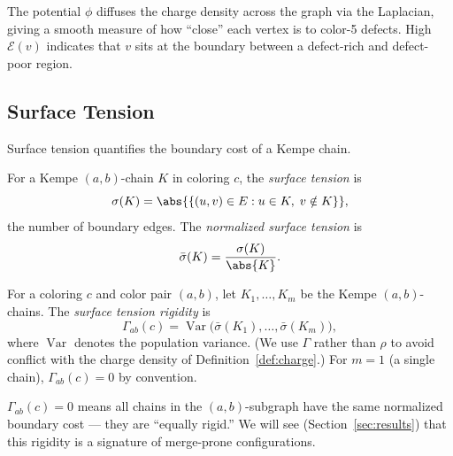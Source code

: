 The potential $\phi$ diffuses the charge density across the graph via
the Laplacian, giving a smooth measure of how ``close'' each vertex is
to color-5 defects. High $\mathcal{E}(v)$ indicates that $v$ sits at
the boundary between a defect-rich and defect-poor region.

\subsection{Surface Tension}\label{sec:surface-tension}

Surface tension quantifies the boundary cost of a Kempe chain.

\begin{definition}\label{def:surface-tension}
For a Kempe $(a,b)$-chain $K$ in coloring $c$, the \emph{surface
tension} is
\begin{equation}\label{eq:surface-tension}
  \sigma(K) = \abs{\{(u, v) \in E : u \in K,\; v \notin K\}},
\end{equation}
the number of boundary edges. The \emph{normalized surface tension} is
\begin{equation}\label{eq:normalized-st}
  \bar{\sigma}(K) = \frac{\sigma(K)}{\abs{K}}.
\end{equation}
\end{definition}

\begin{definition}\label{def:st-rigidity}
For a coloring $c$ and color pair $(a,b)$, let
$K_1, \ldots, K_m$ be the Kempe $(a,b)$-chains. The \emph{surface
tension rigidity} is
\begin{equation}\label{eq:st-rigidity}
  \Gamma_{ab}(c) =
  \operatorname{Var}\bigl(\bar{\sigma}(K_1), \ldots,
  \bar{\sigma}(K_m)\bigr),
\end{equation}
where $\operatorname{Var}$ denotes the population variance. (We use
$\Gamma$ rather than $\rho$ to avoid conflict with the charge density
of Definition~\ref{def:charge}.) For $m = 1$ (a single chain),
$\Gamma_{ab}(c) = 0$ by convention.
\end{definition}

\begin{remark}\label{rem:st-interpretation}
$\Gamma_{ab}(c) = 0$ means all chains in the $(a,b)$-subgraph have the
same normalized boundary cost — they are ``equally rigid.'' We will see
(Section~\ref{sec:results}) that this rigidity is a signature of
merge-prone configurations.
\end{remark}

